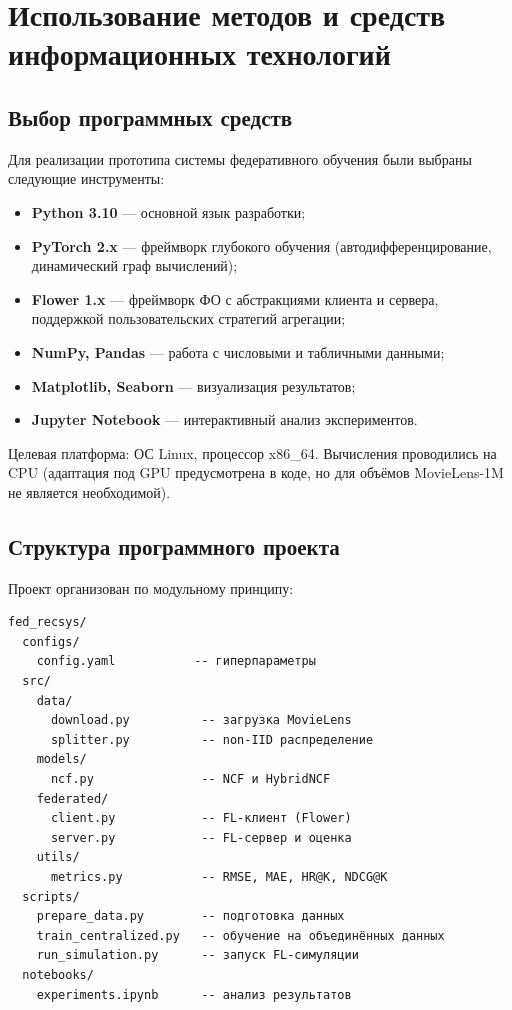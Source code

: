 \documentclass[14pt,a4paper]{extarticle}
\begin{document}
\newpage


\section{Использование методов и средств информационных технологий}

\subsection{Выбор программных средств}

Для реализации прототипа системы федеративного обучения были выбраны следующие инструменты:

\begin{itemize}
  \item \textbf{Python 3.10} --- основной язык разработки;
  \item \textbf{PyTorch 2.x} --- фреймворк глубокого обучения (автодифференцирование, динамический граф вычислений);
  \item \textbf{Flower 1.x} --- фреймворк ФО с абстракциями клиента и сервера, поддержкой пользовательских стратегий агрегации;
  \item \textbf{NumPy, Pandas} --- работа с числовыми и табличными данными;
  \item \textbf{Matplotlib, Seaborn} --- визуализация результатов;
  \item \textbf{Jupyter Notebook} --- интерактивный анализ экспериментов.
\end{itemize}

Целевая платформа: ОС Linux, процессор x86\_64. Вычисления проводились на CPU (адаптация под GPU предусмотрена в коде, но для объёмов MovieLens-1M не является необходимой).


\subsection{Структура программного проекта}

Проект организован по модульному принципу:

\begin{verbatim}
fed_recsys/
  configs/
    config.yaml           -- гиперпараметры
  src/
    data/
      download.py          -- загрузка MovieLens
      splitter.py          -- non-IID распределение
    models/
      ncf.py               -- NCF и HybridNCF
    federated/
      client.py            -- FL-клиент (Flower)
      server.py            -- FL-сервер и оценка
    utils/
      metrics.py           -- RMSE, MAE, HR@K, NDCG@K
  scripts/
    prepare_data.py        -- подготовка данных
    train_centralized.py   -- обучение на объединённых данных
    run_simulation.py      -- запуск FL-симуляции
  notebooks/
    experiments.ipynb      -- анализ результатов
\end{verbatim}
\end{document}

